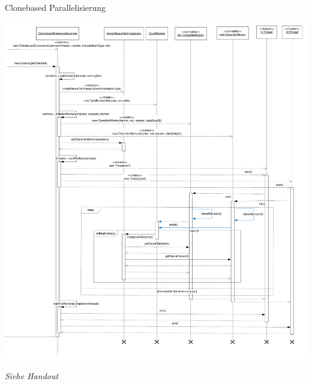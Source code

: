 \documentclass[18pt]{beamer}
\begin{document}
\begin{frame}[allowframebreaks]{Clonebased Parallelisierung}
\begin{center}
		\includegraphics[height=0.7\textheight]{Grafiken/Clonebased_sequencediagram}
	\end{center}
		\begin{center}
		\textit{\tiny{Siehe Handout}}
		\end{center}
	\end{frame}
\end{document}

